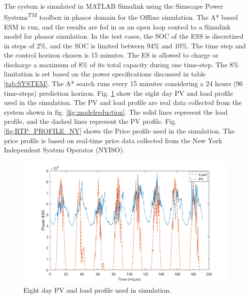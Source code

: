 The system is simulated in MATLAB\textsuperscript{\textregistered} Simulink\textsuperscript{\textregistered} using the Simscape Power Systems\textsuperscript{TM} toolbox in phasor domain for the Offline simulation. The A* based ESM is run, and the results are fed in as an open loop control to a Simulink model for phasor simulation. In the test cases, the  SOC of the ESS is discretized in steps of 2\%, and the SOC is limited between  94\%  and  10\%. The time step and the control horizon chosen is 15 minutes. The ES is allowed to charge or discharge a maximum of 8\% of its total capacity during one time-step. The 8\% limitation is set based on the power specifications discussed in table \ref{tab:SYSTEM}. The A* search runs every 15 minutes considering a 24 hours (96 time-steps) prediction horizon. Fig. \ref{fig:PV_LOAD_PROF} show the eight day PV and load profile used in the simulation. The PV and load profile are real data collected from the system shown in fig. \ref{fig:modelreduction}. The solid lines represent the load profile, and the dashed lines represent the PV profile. Fig. \ref{fig:RTP_PROFILE_NY} shows the Price profile used in the simulation. The price profile is based on real-time price data collected from the New York Independent System Operator (NYISO).


\begin{figure}[!ht]
    \centering
    \includegraphics[width = \linewidth]{figs/PV_LOAD_PROF.png}
    \caption{Eight day PV and load profile used in simulation.}
    \label{fig:PV_LOAD_PROF}
\end{figure}

